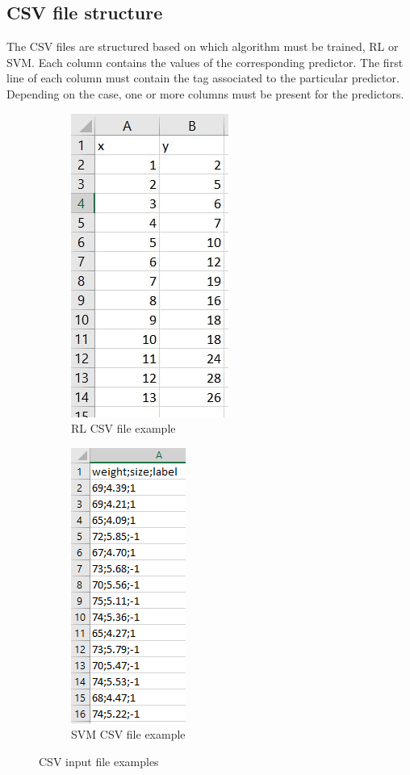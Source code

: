 \subsection{CSV file structure}
The CSV files are structured based on which algorithm must be trained, RL or SVM.
Each column contains the values of the corresponding predictor\glo. The first line  of each column must contain the tag associated to the particular predictor. Depending on the case, one or more columns must be present for the predictors.

\begin{figure}%
\centering
\begin{subfigure}{.5\textwidth}
\centering
\includegraphics[scale=1]{img/json/csvfileRL.jpg}
\caption{RL CSV file example}
\end{subfigure}%
\begin{subfigure}{.5\textwidth}
\centering
\includegraphics[scale=1]{img/json/csvfileSVM.png}
\caption{SVM CSV file example}
\end{subfigure}
\caption{CSV input file examples}
\end{figure}